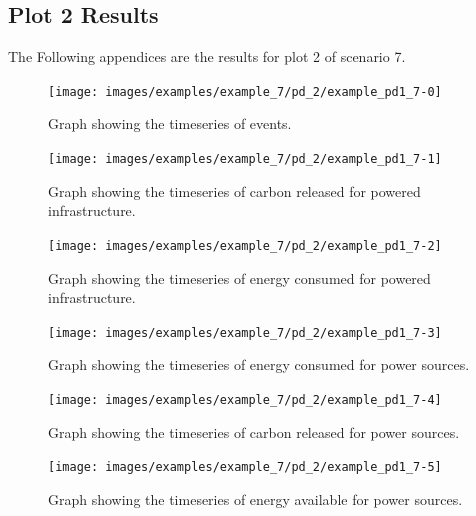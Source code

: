 \documentclass{l4proj}
\begin{document}
\begin{appendices}
\subsection{Plot 2 Results}\label{apen:subsec:scen7plot2}
The Following appendices are the results for plot 2 of scenario 7.
\clearpage
\begin{figure}[htbp]
    \centering
    \texttt{[image: images/examples/example\_7/pd\_2/example\_pd1\_7-0]}
    ~
    \caption{Graph showing the timeseries of events.}
    \label{fig:example_pd1_7-0}
\end{figure}
    \clearpage
\begin{figure}[htbp]
    \centering
    \texttt{[image: images/examples/example\_7/pd\_2/example\_pd1\_7-1]}
    ~
    \caption{Graph showing the timeseries of carbon released for powered infrastructure.}
    \label{fig:example_pd1_7-1}
\end{figure}
    \clearpage
\begin{figure}[htbp]
    \centering
    \texttt{[image: images/examples/example\_7/pd\_2/example\_pd1\_7-2]}
    ~
    \caption{Graph showing the timeseries of energy consumed for powered infrastructure.}
    \label{fig:example_pd1_7-2}
\end{figure}
    \clearpage
\begin{figure}[htbp]
    \centering
    \texttt{[image: images/examples/example\_7/pd\_2/example\_pd1\_7-3]}
    ~
    \caption{Graph showing the timeseries of energy consumed for power sources.}
    \label{fig:example_pd1_7-3}
\end{figure}
    \clearpage
\begin{figure}[htbp]
    \centering
    \texttt{[image: images/examples/example\_7/pd\_2/example\_pd1\_7-4]}
    ~
    \caption{Graph showing the timeseries of carbon released for power sources.}
    \label{fig:example_pd1_7-4}
\end{figure}
    \clearpage
\begin{figure}[htbp]
    \centering
    \texttt{[image: images/examples/example\_7/pd\_2/example\_pd1\_7-5]}
    ~
    \caption{Graph showing the timeseries of energy available for power sources.}
    \label{fig:example_pd1_7-5}
\end{figure}

\clearpage

\end{appendices}
\end{document}
